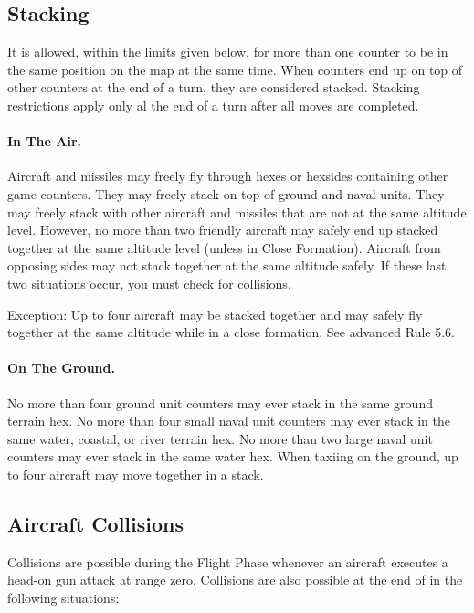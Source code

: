 \subsection{Stacking}

It is allowed, within the limits given below, for more than one counter to be in the same position on the map at the same time. When counters end up on top of other counters at the end of a turn, they are considered stacked. Stacking restrictions apply only al the end of a turn after all moves are completed.

\paragraph{In The Air.} Aircraft and missiles may freely fly through hexes or hexsides containing other game counters. They may freely stack on top of ground and naval units. They may freely stack with other aircraft and missiles that are not at the same altitude level. However, no more than two friendly aircraft may safely end up stacked together at the same altitude level (unless in Close Formation). Aircraft from opposing sides may not stack together at the same altitude safely. If these last two situations occur, you must check for collisions.

Exception: Up to four aircraft may be stacked together and may safely fly together at the same altitude while in a close formation. See advanced Rule 5.6.

\paragraph{On The Ground.} No more than four ground unit counters may ever stack in the same ground terrain hex. No more than four small naval unit counters may ever stack in the same water, coastal, or river terrain hex. No more than two large naval unit counters may ever stack in the same water hex. When taxiing on the ground, up to four aircraft may move together in a stack.

\subsection{Aircraft Collisions}

Collisions are possible during the Flight Phase whenever an aircraft executes a head-on gun attack at range zero. Collisions are also possible at the end of  in the following situations:

